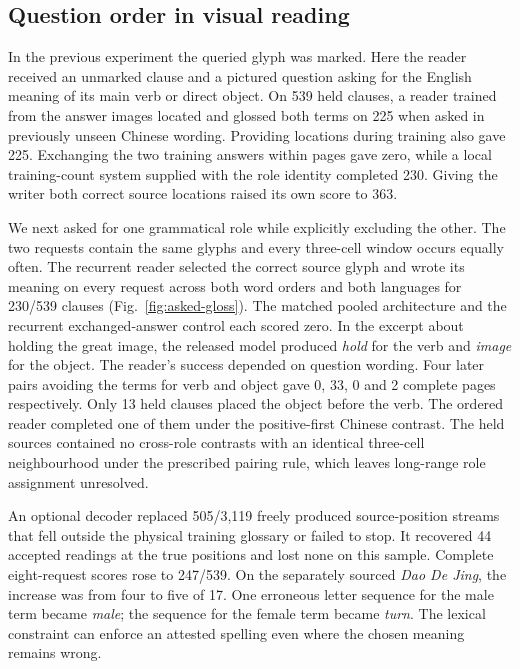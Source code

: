 \subsection*{Question order in visual reading}
In the previous experiment the queried glyph was marked. Here the reader received an unmarked clause and a pictured question asking for the English meaning of its main verb or direct object. On 539 held clauses, a reader trained from the answer images located and glossed both terms on 225 when asked in previously unseen Chinese wording. Providing locations during training also gave 225. Exchanging the two training answers within pages gave zero, while a local training-count system supplied with the role identity completed 230. Giving the writer both correct source locations raised its own score to 363.

We next asked for one grammatical role while explicitly excluding the other. The two requests contain the same glyphs and every three-cell window occurs equally often. The recurrent reader selected the correct source glyph and wrote its meaning on every request across both word orders and both languages for 230/539 clauses (Fig.~\ref{fig:asked-gloss}). The matched pooled architecture and the recurrent exchanged-answer control each scored zero. In the excerpt about holding the great image, the released model produced \textit{hold} for the verb and \textit{image} for the object. The reader's success depended on question wording. Four later pairs avoiding the terms for verb and object gave 0, 33, 0 and 2 complete pages respectively. Only 13 held clauses placed the object before the verb. The ordered reader completed one of them under the positive-first Chinese contrast. The held sources contained no cross-role contrasts with an identical three-cell neighbourhood under the prescribed pairing rule, which leaves long-range role assignment unresolved.

An optional decoder replaced 505/3,119 freely produced source-position streams that fell outside the physical training glossary or failed to stop. It recovered 44 accepted readings at the true positions and lost none on this sample. Complete eight-request scores rose to 247/539. On the separately sourced \textit{Dao De Jing}, the increase was from four to five of 17. One erroneous letter sequence for the male term became \textit{male}; the sequence for the female term became \textit{turn}. The lexical constraint can enforce an attested spelling even where the chosen meaning remains wrong.
